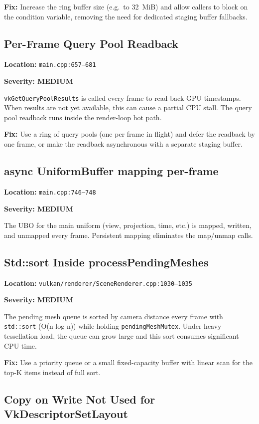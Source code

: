 \documentclass[a4paper,11pt]{article}
\begin{document}
\textbf{Fix:} Increase the ring buffer size (e.g.\ to 32~MiB) and allow
callers to block on the condition variable, removing the need for dedicated
staging buffer fallbacks.

\subsection{Per-Frame Query Pool Readback}

\textbf{Location:} \texttt{main.cpp:657--681}

\textbf{Severity: MEDIUM}

\texttt{vkGetQueryPoolResults} is called every frame to read back GPU
timestamps. When results are not yet available, this can cause a partial
CPU stall. The query pool readback runs inside the render-loop hot path.

\textbf{Fix:} Use a ring of query pools (one per frame in flight) and defer
the readback by one frame, or make the readback asynchronous with a separate
staging buffer.

\subsection{async UniformBuffer mapping per-frame}

\textbf{Location:} \texttt{main.cpp:746--748}

\textbf{Severity: MEDIUM}

The UBO for the main uniform (view, projection, time, etc.) is mapped,
written, and unmapped every frame. Persistent mapping eliminates the
map/unmap calls.

\subsection{Std::sort Inside processPendingMeshes}

\textbf{Location:} \texttt{vulkan/renderer/SceneRenderer.cpp:1030--1035}

\textbf{Severity: MEDIUM}

The pending mesh queue is sorted by camera distance every frame with
\texttt{std::sort} (O(n log n)) while holding \texttt{pending\-MeshMutex}.
Under heavy tessellation load, the queue can grow large and this sort
consumes significant CPU time.

\textbf{Fix:} Use a priority queue or a small fixed-capacity buffer with
linear scan for the top-K items instead of full sort.

\subsection{Copy on Write Not Used for VkDescriptorSetLayout}
\end{document}
